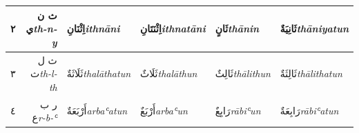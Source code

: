 \documentclass[11pt, a4paper]{article}
\begin{document}
\begin{center}
\begin{threeparttable}
\begin{tabular}{ C R A A A A }
			{\Large\textarabic{٢}}                        &
			{\Large\textarabic{ث ن ي}}\newline \textit{\small th-n-y}                &
			{\Large\textarabic{اِثْنَانِ}}\newline \textit{\small ithnāni}               &
			{\Large\textarabic{اِثْنَتَانِ}}\newline \textit{\small ithnatāni}            &
			{\Large\textarabic{ثَانٍ}}\newline \textit{\small thānin}                  &
			{\Large\textarabic{ثَانِيَةٌ}}\newline \textit{\small thāniyatun}                                                                                                                                 \\
			\midrule

			{\Large\textarabic{٣}}                        &
			{\Large\textarabic{ث ل ث}}\newline \textit{\small th-l-th}               &
			{\Large\textarabic{ثَلَاثَةٌ}}\newline \textit{\small thalāthatun}           &
			{\Large\textarabic{ثَلَاثٌ}}\newline \textit{\small thalāthun}              &
			{\Large\textarabic{ثَالِثٌ}}\newline \textit{\small thālithun}              &
			{\Large\textarabic{ثَالِثَةٌ}}\newline \textit{\small thālithatun}                                                                                                                                \\
			\midrule

			{\Large\textarabic{٤}}                        &
			{\Large\textarabic{ر ب ع}}\newline \textit{\small r-b-ʿ}                 &
			{\Large\textarabic{أَرْبَعَةٌ}}\newline \textit{\small arbaʿatun}             &
			{\Large\textarabic{أَرْبَعٌ}}\newline \textit{\small arbaʿun}                &
			{\Large\textarabic{رَابِعٌ}}\newline \textit{\small rābiʿun}                &
			{\Large\textarabic{رَابِعَةٌ}}\newline \textit{\small rābiʿatun}                                                                                                                                  \\
			\midrule


\end{tabular}
\end{threeparttable}
\end{center}
\end{document}
